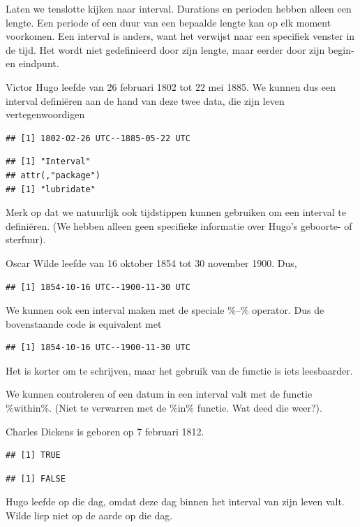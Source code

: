 \documentclass[]{tufte-book}
\begin{document}
Laten we tenslotte kijken naar interval. Durations en perioden hebben alleen een lengte. Een periode of een duur van een bepaalde lengte kan op elk moment voorkomen.
Een interval is anders, want het verwijst naar een specifiek venster in de tijd. Het wordt niet gedefinieerd door zijn lengte, maar eerder door zijn begin- en eindpunt.

Victor Hugo leefde van 26 februari 1802 tot 22 mei 1885. We kunnen dus een interval definiëren aan de hand van deze twee data, die zijn leven vertegenwoordigen

\begin{verbatim}
## [1] 1802-02-26 UTC--1885-05-22 UTC
\end{verbatim}

\begin{verbatim}
## [1] "Interval"
## attr(,"package")
## [1] "lubridate"
\end{verbatim}

Merk op dat we natuurlijk ook tijdstippen kunnen gebruiken om een interval te definiëren. (We hebben alleen geen specifieke informatie over Hugo's geboorte- of sterfuur).

Oscar Wilde leefde van 16 oktober 1854 tot 30 november 1900. Dus,

\begin{verbatim}
## [1] 1854-10-16 UTC--1900-11-30 UTC
\end{verbatim}

We kunnen ook een interval maken met de speciale \%--\% operator. Dus de bovenstaande code is equivalent met

\begin{verbatim}
## [1] 1854-10-16 UTC--1900-11-30 UTC
\end{verbatim}

Het is korter om te schrijven, maar het gebruik van de functie is iets leesbaarder.

We kunnen controleren of een datum in een interval valt met de functie \%within\%. (Niet te verwarren met de \%in\% functie. Wat deed die weer?).

Charles Dickens is geboren op 7 februari 1812.

\begin{verbatim}
## [1] TRUE
\end{verbatim}

\begin{verbatim}
## [1] FALSE
\end{verbatim}

Hugo leefde op die dag, omdat deze dag binnen het interval van zijn leven valt. Wilde liep niet op de aarde op die dag.
\end{document}
